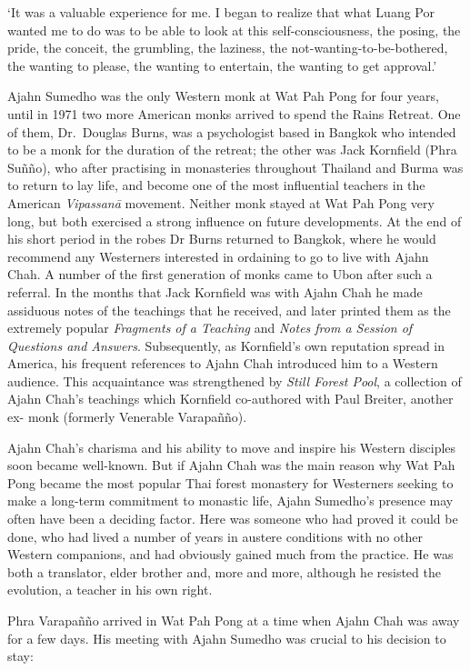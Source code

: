 `It was a valuable experience for me. I
began to realize that what Luang Por wanted me to do was to be able to
look at this self-consciousness, the posing, the pride, the conceit, the
grumbling, the laziness, the not-wanting-to-be-bothered, the wanting to
please, the wanting to entertain, the wanting to get approval.'

Ajahn Sumedho was the only Western monk at Wat Pah Pong for four years, 
until in 1971 two more American monks arrived to spend the Rains
Retreat. One of them, Dr.~Douglas Burns, was a psychologist based in
Bangkok who intended to be a monk for the duration of the retreat; the
other was Jack Kornfield (Phra Suñño), who after practising in
monasteries throughout Thailand and Burma was to return to lay life, and
become one of the most influential teachers in the American
\emph{Vipassanā} movement. Neither monk stayed at Wat Pah Pong very
long, but both exercised a strong influence on future developments. At
the end of his short period in the robes Dr Burns returned to Bangkok, 
where he would recommend any Westerners interested in ordaining to go to
live with Ajahn Chah. A number of the first generation of monks came to
Ubon after such a referral. In the months that Jack Kornfield was with
Ajahn Chah he made assiduous notes of the teachings that he received, 
and later printed them as the extremely popular \emph{Fragments of a
Teaching} and \emph{Notes from a Session of Questions and Answers}. 
Subsequently, as Kornfield's own reputation spread in America, his
frequent references to Ajahn Chah introduced him to a Western audience. 
This acquaintance was strengthened by \emph{Still Forest Pool}, a
collection of Ajahn Chah's teachings which Kornfield co-authored with
Paul Breiter, another ex- monk (formerly Venerable Varapañño). 

Ajahn Chah's charisma and his ability to move and inspire his Western
disciples soon became well-known. But if Ajahn Chah was the main reason
why Wat Pah Pong became the most popular Thai forest monastery for
Westerners seeking to make a long-term commitment to monastic life, 
Ajahn Sumedho's presence may often have been a deciding factor. Here was
someone who had proved it could be done, who had lived a number of years
in austere conditions with no other Western companions, and had
obviously gained much from the practice. He was both a translator, elder
brother and, more and more, although he resisted the evolution, a
teacher in his own right.

Phra Varapañño arrived in Wat Pah Pong at a
time when Ajahn Chah was away for a few days. His meeting with Ajahn
Sumedho was crucial to his decision to stay: 

